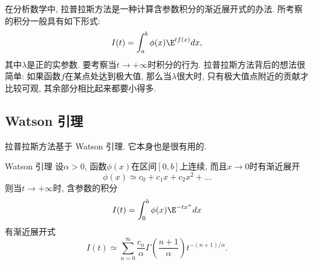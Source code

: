 

在分析数学中, 拉普拉斯方法是一种计算含参数积分的渐近展开式的办法. 所考察的积分一般具有如下形式:
\begin{equation}\label{LapAsm_eq1}
I(t)=\int_a^b \phi(x)\E^{t f(x)}dx,
\end{equation}
其中$\lambda$是正的实参数. 要考察当$t\to+\infty$时积分的行为. 拉普拉斯方法背后的想法很简单: 如果函数$f$在某点处达到极大值, 那么当$\lambda$很大时, 只有极大值点附近的贡献才比较可观, 其余部分相比起来都要小得多.

\subsection{Watson 引理}
拉普拉斯方法基于 Watson 引理. 它本身也是很有用的.

\begin{lemma}{Watson 引理}
设$\alpha>0$, 函数$\phi(x)$在区间$[0,b]$上连续, 而且$x\to0$时有渐近展开
$$
\phi(x)\simeq c_0+c_1x+c_2x^2+...
$$
则当$t\to+\infty$时, 含参数的积分
$$
I(t)=\int_0^b \phi(x)\E^{-t x^\alpha}dx
$$
有渐近展开式
$$
I(t)\simeq\sum_{n=0}^\infty \frac{c_n}{\alpha}\Gamma\left(\frac{n+1}{\alpha}\right)t^{-(n+1)/\alpha}.
$$
\end{lemma}

